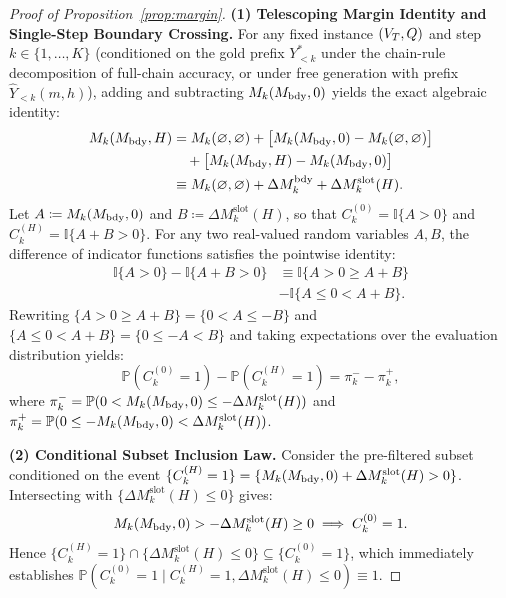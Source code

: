 \begin{proof}[Proof of Proposition~\ref{prop:margin}]
\textbf{(1) Telescoping Margin Identity and Single-Step Boundary Crossing.}
For any fixed instance $(V_T, Q)$ and step $k \in \{1, \dots, K\}$ (conditioned on the gold prefix $Y^*_{<k}$ under the chain-rule decomposition of full-chain accuracy, or under free generation with prefix $\hat{Y}_{<k}(m,h)$), adding and subtracting $M_k(M_{\mathrm{bdy}}, 0)$ yields the exact algebraic identity:
\begin{align}
  M_k(M_{\mathrm{bdy}}, H) &= M_k(\varnothing, \varnothing) + \big[M_k(M_{\mathrm{bdy}}, 0) - M_k(\varnothing, \varnothing)\big] \nonumber \\
  &\quad + \big[M_k(M_{\mathrm{bdy}}, H) - M_k(M_{\mathrm{bdy}}, 0)\big] \nonumber \\
  &\equiv M_k(\varnothing, \varnothing) + \Delta M_k^{\mathrm{bdy}} + \Delta M_k^{\mathrm{slot}}(H).
\end{align}
Let $A \coloneqq M_k(M_{\mathrm{bdy}}, 0)$ and $B \coloneqq \Delta M_k^{\mathrm{slot}}(H)$, so that $C_k^{(0)} = \mathbb{I}\{A > 0\}$ and $C_k^{(H)} = \mathbb{I}\{A + B > 0\}$. For any two real-valued random variables $A, B$, the difference of indicator functions satisfies the pointwise identity:
\begin{equation}
  \begin{aligned}\mathbb{I}\{A > 0\} - \mathbb{I}\{A + B > 0\} &\equiv \mathbb{I}\{A > 0 \ge A + B\} \\ &- \mathbb{I}\{A \le 0 < A + B\}.\end{aligned}
\end{equation}
Rewriting $\{A > 0 \ge A + B\} = \{0 < A \le -B\}$ and $\{A \le 0 < A + B\} = \{0 \le -A < B\}$ and taking expectations over the evaluation distribution yields:
\begin{equation}
  \mathbb{P}(C_k^{(0)} = 1) - \mathbb{P}(C_k^{(H)} = 1) = \pi_k^- - \pi_k^+,
\end{equation}
where $\pi_k^- = \mathbb{P}(0 < M_k(M_{\mathrm{bdy}}, 0) \le -\Delta M_k^{\mathrm{slot}}(H))$ and $\pi_k^+ = \mathbb{P}(0 \le -M_k(M_{\mathrm{bdy}}, 0) < \Delta M_k^{\mathrm{slot}}(H))$.

\textbf{(2) Conditional Subset Inclusion Law.}
Consider the pre-filtered subset conditioned on the event $\{C_k^{(H)} = 1\} = \{M_k(M_{\mathrm{bdy}}, 0) + \Delta M_k^{\mathrm{slot}}(H) > 0\}$. Intersecting with $\{\Delta M_k^{\mathrm{slot}}(H) \le 0\}$ gives:
\begin{equation}
  M_k(M_{\mathrm{bdy}}, 0) > -\Delta M_k^{\mathrm{slot}}(H) \ge 0 \implies C_k^{(0)} = 1.
\end{equation}
Hence $\{C_k^{(H)} = 1\} \cap \{\Delta M_k^{\mathrm{slot}}(H) \le 0\} \subseteq \{C_k^{(0)} = 1\}$, which immediately establishes $\mathbb{P}(C_k^{(0)} = 1 \mid C_k^{(H)} = 1, \Delta M_k^{\mathrm{slot}}(H) \le 0) \equiv 1$.


\end{proof}
